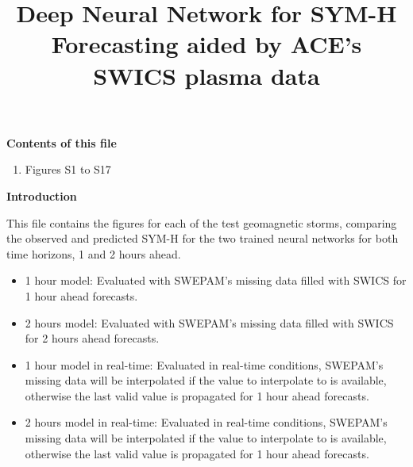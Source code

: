 \documentclass[draft,sw]{agutexSI2019}
\begin{document}
\title{Deep Neural Network for SYM-H Forecasting aided by ACE's SWICS plasma data}



\begin{article}

\renewcommand\tablename{Figure}



\noindent\textbf{Contents of this file}
\begin{enumerate}
\item Figures S1 to S17
\end{enumerate}



\noindent\textbf{Introduction}

This file contains the figures for each of the test geomagnetic storms, comparing the observed and predicted SYM-H for the two trained neural networks for both time horizons, 1 and 2 hours ahead. 

\begin{itemize}
    \item 1 hour model: Evaluated with SWEPAM's missing data filled with SWICS for 1 hour ahead forecasts.
    \vspace*{-5pt}
    \item 2 hours model: Evaluated with SWEPAM's missing data filled with SWICS for 2 hours ahead forecasts.
    \vspace*{-5pt}
    \item 1 hour model in real-time: Evaluated in real-time conditions, SWEPAM's missing data will be interpolated if the value to interpolate to is available, otherwise the last valid value is propagated for 1 hour ahead forecasts.
    \vspace*{-5pt}
    \item 2 hours model in real-time: Evaluated in real-time conditions, SWEPAM's missing data will be interpolated if the value to interpolate to is available, otherwise the last valid value is propagated for 1 hour ahead forecasts.
\end{itemize}


\end{article}
\clearpage
\end{document}
